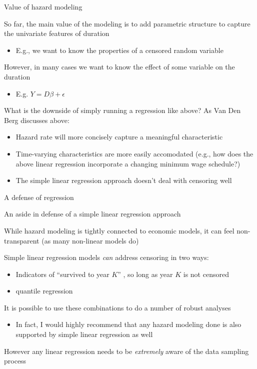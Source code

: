 \documentclass[notes,11pt, aspectratio=169]{beamer}
\newenvironment{wideitemize}{\itemize\addtolength{\itemsep}{10pt}}{\enditemize}
\begin{document}
\begin{frame}{Value of hazard modeling}
  \begin{wideitemize}
  \item So far, the main value of the modeling is to add parametric
    structure to capture the univariate features of duration
    \begin{itemize}
    \item E.g., we want to know the properties of a censored random variable
    \end{itemize}
  \item However, in many cases we want to know the effect of some
    variable on the duration
    \begin{itemize}
    \item E.g. $Y = D\beta + \epsilon$
    \end{itemize}
  \item What is the downside of simply running a regression like
    above? As Van Den Berg discusses above:
    \begin{itemize}
    \item Hazard rate will more concisely capture a meaningful
      characteristic
    \item Time-varying characteristics are more easily accomodated
      (e.g., how does the above linear regression incorporate a
      changing minimum wage schedule?)
    \item The simple linear regression approach doesn't deal with
      censoring well
    \end{itemize}
  \end{wideitemize}
\end{frame}

\begin{frame}{A defense of regression}
  \begin{wideitemize}
  \item An aside in defense of a simple linear regression approach
  \item While hazard modeling is tightly connected to economic
    models, it can feel non-transparent (as many non-linear models
    do)
  \item Simple linear regression models \emph{can} address censoring in two ways:
    \begin{itemize}
    \item Indicators of ``survived to year $K$'' , so long as year
      $K$ is not censored
    \item quantile regression
    \end{itemize}
  \item It is possible to use these combinations to do a number of
    robust analyses
    \begin{itemize}
    \item In fact, I would highly recommend that any hazard modeling
      done is also supported by simple linear regression as well
    \end{itemize}
  \item However any linear regression needs to be \emph{extremely}
    aware of the data sampling process
  \end{wideitemize}
\end{frame}
\end{document}
